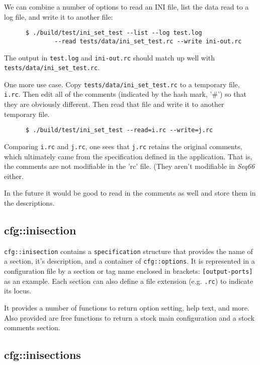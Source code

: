    We can combine a number of options to read an INI file, list the
   data read to a log file, and write it to another file:

   \begin{verbatim}
      $ ./build/test/ini_set_test --list --log test.log
              --read tests/data/ini_set_test.rc --write ini-out.rc
   \end{verbatim}

   The output in \texttt{test.log} and \texttt{ini-out.rc}
   should match up well with \texttt{tests/data/ini\_set\_test.rc}.

   One more use case. Copy \texttt{tests/data/ini\_set\_test.rc}
   to a temporary file, \texttt{i.rc}.
   Then edit all of the comments (indicated by the hash mark, '\#')
   so that they are obviously different.
   Then read that file and write it to another temporary file.

   \begin{verbatim}
      $ ./build/test/ini_set_test --read=i.rc --write=j.rc
   \end{verbatim}

   Comparing \texttt{i.rc} and \texttt{j.rc}, one sees that
   \texttt{j.rc} retains the original comments, which ultimately
   came from the specification defined in the application.
   That is, the comments are not modifiable in the 'rc' file.
   (They aren't modifiable in \textsl{Seq66} either.

   In the future it would be good to read in the comments as well
   and store them in the descriptions.

\subsection{cfg::inisection}
\label{subsec:cfg_namespace_inisection}

   \texttt{cfg::inisection}  contains a \texttt{specification} structure that
   provides the name of a section, it's description, and
   a container of \texttt{cfg::options}.
   It is represented in a configuration file by a section or tag name
   enclosed in brackets: \texttt{[output-ports]} as an example.
   Each section can also define a file extension
   (e.g. \texttt{.rc}) to indicate its locus.

   It provides a number of functions to return option setting, help text, and
   more.
   Also provided are free functions to return a stock main configuration
   and a stock comments section.

\subsection{cfg::inisections}
\label{subsec:cfg_namespace_inisections}

